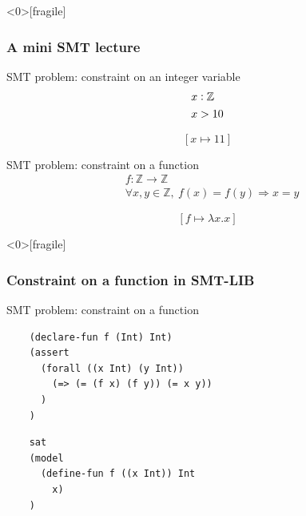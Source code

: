 
\begin{frame}<0>[fragile]
  \frametitle{A mini SMT lecture} \small

\begin{block}{SMT problem: constraint on an integer variable}
\[
\begin{aligned}
& x : \mathbb{Z} \\
& x > 10
\end{aligned}
\]
\end{block}

\pause

\[
[x \mapsto 11]
\]

\pause

\begin{block}{SMT problem: constraint on a function}
\[
\begin{aligned}
& f : \mathbb{Z} \to \mathbb{Z} \\
& \forall x, y \in \mathbb{Z},\ f(x) = f(y) \Rightarrow x = y
\end{aligned}
\]
\end{block}

\pause

\[
[f \mapsto \lambda x. x]
\]

\end{frame}


\begin{frame}<0>[fragile]
  \frametitle{Constraint on a function in SMT-LIB} \small

\begin{block}{SMT problem: constraint on a function}
\begin{verbatim}
    (declare-fun f (Int) Int)
    (assert
      (forall ((x Int) (y Int))
        (=> (= (f x) (f y)) (= x y))
      )
    )
\end{verbatim}
\end{block}

\begin{verbatim}
    sat
    (model
      (define-fun f ((x Int)) Int
        x)
    )
\end{verbatim}

\end{frame}


